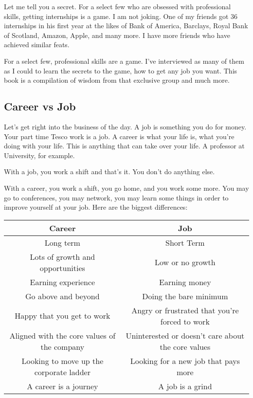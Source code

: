 \documentclass{article}
\begin{document}
Let me tell you a secret. For a select few who are obsessed with
professional skills, getting internships is a game. I am not joking. One
of my friends got 36 internships in his first year at the likes of Bank
of America, Barclays, Royal Bank of Scotland, Amazon, Apple, and many
more. I have more friends who have achieved similar feats.

For a select few, professional skills are a game. I've interviewed as
many of them as I could to learn the secrets to the game, how to get any
job you want. This book is a compilation of wisdom from that exclusive
group and much more.
\subsection{Career vs Job}
Let's get right into the business of the day. A job is something you do
for money. Your part time Tesco work is a job. A career is what your
life is, what you're doing with your life. This is anything that can
take over your life. A professor at University, for example.

With a job, you work a shift and that's it. You don't do anything else.

With a career, you work a shift, you go home, and you work some more.
You may go to conferences, you may network, you may learn some things in
order to improve yourself at your job. Here are the biggest differences:

\begin{center}

\begin{tabular}{||c|c||}
 \hline
 Career & Job \\ [0.5ex] 
 \hline\hline
 Long term & Short Term \\ 
 \hline
 Lots of growth and opportunities & Low or no growth \\
 \hline
Earning experience & Earning money \\
 \hline
Go above and beyond & Doing the bare minimum \\
 \hline
Happy that you get to work & Angry or frustrated that you're forced to
work \\ 
\hline
Aligned with the core values of the company & Uninterested or doesn't
care about the core values \\
\hline
Looking to move up the corporate ladder & Looking for a new job that
pays more \\
\hline
A career is a journey & A job is a grind \\
[1ex] 
 \hline
\end{tabular}
\end{center}
\end{document}
